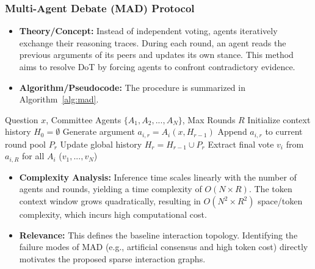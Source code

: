 \documentclass[a4paper,fleqn]{cas-sc}
\begin{document}
\subsubsection{Multi-Agent Debate (MAD) Protocol}
\begin{itemize}
    \item \textbf{Theory/Concept:} Instead of independent voting, agents iteratively exchange their reasoning traces. During each round, an agent reads the previous arguments of its peers and updates its own stance. This method aims to resolve DoT by forcing agents to confront contradictory evidence.
    \item \textbf{Algorithm/Pseudocode:} The procedure is summarized in Algorithm~\ref{alg:mad}.
\end{itemize}
\begin{algorithm}[H]
\caption{Multi-agent debate (MAD) protocol.}
\label{alg:mad}
\begin{algorithmic}[1]
\REQUIRE Question $x$, Committee Agents $\{A_1, A_2, ..., A_N\}$, Max Rounds $R$
\STATE Initialize context history $H_0 = \emptyset$
        \STATE Generate argument $a_{i,r} = A_i(x, H_{r-1})$
        \STATE Append $a_{i,r}$ to current round pool $P_r$
    \ENDFOR
    \STATE Update global history $H_r = H_{r-1} \cup P_r$
\ENDFOR
\STATE Extract final vote $v_i$ from $a_{i,R}$ for all $A_i$
\RETURN {}($v_1, ..., v_N$)
\end{algorithmic}
\end{algorithm}
\begin{itemize}
    \item \textbf{Complexity Analysis:} Inference time scales linearly with the number of agents and rounds, yielding a time complexity of $O(N \times R)$. The token context window grows quadratically, resulting in $O(N^2 \times R^2)$ space/token complexity, which incurs high computational cost.
    \item \textbf{Relevance:} This defines the baseline interaction topology. Identifying the failure modes of MAD (e.g., artificial consensus and high token cost) directly motivates the proposed sparse interaction graphs.
\end{itemize}
\end{document}
